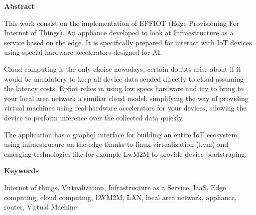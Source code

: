 
\newpage

\thispagestyle{empty}

\begin{center}

{\bf \Huge Abstract}

  \end{center}
\vspace{1cm}

This work consist on the implementation of EPFIOT (Edge Provisioning For Internet of Things). An appliance developed to look at Infraestructure as a service based on the edge. It is specifically prepared for interact with IoT devices using special hardware accelerators designed for AI.

Cloud computing is the only choice nowadays, certain doubts arise about if it would be mandatory to keep all device data sended directly to cloud assuming the latency costs, Epfiot relies in using low specs hardware and try to bring to your local area network a similiar cloud model, simplifying the way of providing virtual machines using real hardware accelerators for your devices, allowing the device to perform inference over the collected data quickly.

The application has a graphql interface for building an entire IoT ecosystem, using infraestrucure on the edge thanks to linux virtualization (kvm) and emerging technologies like for example LwM2M to provide device bootstraping.

\vspace{1cm}


\begin{center}

{\bf \Large Keywords}

   \end{center}

   \vspace{0.5cm}
   
Internet of things, Virtualization, Infrastructure as a Service, IaaS, Edge computing, cloud computing, LWM2M, LAN, local area network, appliance, router, Virtual Machine
   


